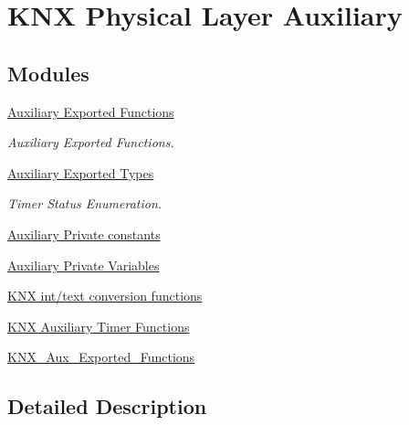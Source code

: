 \hypertarget{group___k_n_x___aux}{}\section{K\+NX Physical Layer Auxiliary}
\label{group___k_n_x___aux}
\subsection*{Modules}
\begin{DoxyCompactItemize}
\item 
\hyperlink{group___k_n_x___aux___exported___consts}{Auxiliary Exported Functions}
\begin{DoxyCompactList}\small\item\em Auxiliary Exported Functions. \end{DoxyCompactList}\item 
\hyperlink{group___k_n_x___aux___exported___types}{Auxiliary Exported Types}
\begin{DoxyCompactList}\small\item\em Timer Status Enumeration. \end{DoxyCompactList}\item 
\hyperlink{group___k_n_x___aux___private___consts}{Auxiliary Private constants}
\item 
\hyperlink{group___k_n_x___aux___private___variables}{Auxiliary Private Variables}
\item 
\hyperlink{group___k_n_x___aux___exported___functions___group1}{K\+N\+X int/text conversion functions}
\item 
\hyperlink{group___k_n_x___aux___exported___functions___group2}{K\+N\+X Auxiliary Timer Functions}
\item 
\hyperlink{group___k_n_x___aux___exported___functions}{K\+N\+X\+\_\+\+Aux\+\_\+\+Exported\+\_\+\+Functions}
\end{DoxyCompactItemize}


\subsection{Detailed Description}
